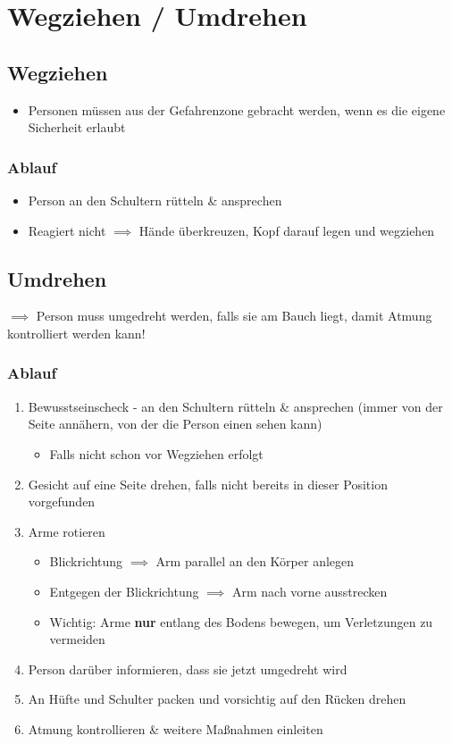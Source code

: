 \chapter{Wegziehen / Umdrehen}

\section{Wegziehen}
\begin{itemize}
    \item Personen müssen aus der Gefahrenzone gebracht werden, wenn es die eigene Sicherheit erlaubt
\end{itemize}
\subsection*{Ablauf}
\begin{itemize}
    \item Person an den Schultern rütteln \& ansprechen
    \item Reagiert nicht $\implies$ Hände überkreuzen, Kopf darauf legen und wegziehen
\end{itemize}

\section{Umdrehen}
$\implies$ Person muss umgedreht werden, falls sie am Bauch liegt, damit Atmung kontrolliert werden kann!

\subsection*{Ablauf}
\begin{enumerate}
    \item Bewusstseinscheck - an den Schultern rütteln \& ansprechen (immer von der Seite annähern, von der die Person einen sehen kann)
    \begin{itemize}
        \item Falls nicht schon vor Wegziehen erfolgt
    \end{itemize}
    \item Gesicht auf eine Seite drehen, falls nicht bereits in dieser Position vorgefunden
    \item Arme rotieren
    \begin{itemize}
        \item Blickrichtung $\implies$ Arm parallel an den Körper anlegen
        \item Entgegen der Blickrichtung $\implies$ Arm nach vorne ausstrecken
        \item Wichtig: Arme \textbf{nur} entlang des Bodens bewegen, um Verletzungen zu vermeiden
    \end{itemize}
    \item Person darüber informieren, dass sie jetzt umgedreht wird
    \item An Hüfte und Schulter packen und vorsichtig auf den Rücken drehen
    \item Atmung kontrollieren \& weitere Maßnahmen einleiten
\end{enumerate}


